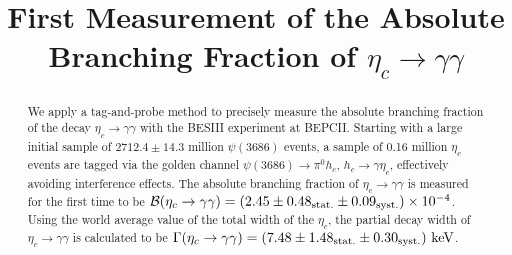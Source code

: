 \documentclass[twocolumn,showpacs,aps,prl]{revtex4-2}
\begin{document}
\let\oldequationstar\equation
\let\oldendequationstar\endequation
\renewenvironment{equation*}
{\linenomathNonumbers\oldequationstar\nonumber}
{\oldendequationstar\endlinenomath}



\title{\bf \boldmath
First Measurement of the Absolute Branching Fraction of $\eta_c \to \gamma \gamma$
}


\author{}

\begin{abstract}
We apply a tag-and-probe method to precisely measure the absolute branching fraction of the decay $\eta_c \to \gamma \gamma$ with the BESIII experiment at BEPCII. Starting with a large initial sample of $2712.4\pm 14.3$ million $\psi(3686)$ events, a sample of 0.16 million $\eta_c$ events are tagged via the golden channel $\psi(3686)\to \pi^0 h_c$, $h_c\to \gamma \eta_c$, effectively avoiding interference effects. The absolute branching fraction of $\eta_c \to \gamma \gamma$ is measured for the first time to be $\mathcal{B}(\eta_c \to \gamma \gamma) = (2.45 \pm 0.48_{\rm stat.} \pm 0.09_{\rm syst.}) \times 10^{-4}$. Using the world average value of the total width of the $\eta_c$, the partial decay width of $\eta_c \to \gamma \gamma$ is calculated to be $\Gamma(\eta_c \to \gamma \gamma) = (7.48 \pm 1.48_{\rm stat.} \pm 0.30_{\rm syst.})~{\rm keV}$.

\end{abstract}



\maketitle

\oddsidemargin  -0.2cm
\evensidemargin -0.2cm
\end{document}
